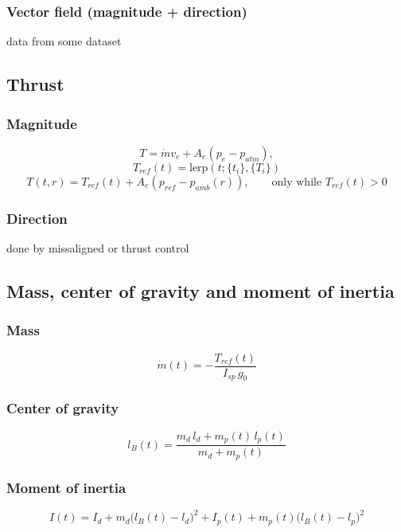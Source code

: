 \documentclass[10pt]{extarticle}
\numberwithin{equation}{subsection}
\begin{document}
\subsubsection{Vector field (magnitude + direction)}
data from some dataset

\subsection{Thrust}
\subsubsection{Magnitude}
\begin{equation}
    T = \dot{m}v_e + A_e(p_e - p_{atm}),
\end{equation}
\begin{equation}
    T_{ref}(t) = \mathrm{lerp}\!\left(t; \{t_i\}, \{T_i\}\right)
\end{equation}
\begin{equation}
    T(t, r) = T_{ref}(t) + A_e\left(p_{ref} - p_{amb}(r)\right), \qquad \text{only while } T_{ref}(t) > 0
\end{equation}

\subsubsection{Direction}
done by missaligned or thrust control

\subsection{Mass, center of gravity and moment of inertia}
\subsubsection{Mass}
\begin{equation}
    \dot{m}(t) = -\frac{T_{ref}(t)}{I_{sp}\,g_0}
\end{equation}

\subsubsection{Center of gravity}
\begin{equation}
    l_B(t) = \frac{m_d\,l_d + m_p(t)\,l_p(t)}{m_d + m_p(t)}
\end{equation}

\subsubsection{Moment of inertia}
\begin{equation}
    I(t) = I_d + m_d\bigl(l_B(t)-l_d\bigr)^2 + I_p(t) + m_p(t)\bigl(l_B(t)-l_p\bigr)^2
\end{equation}
\end{document}
